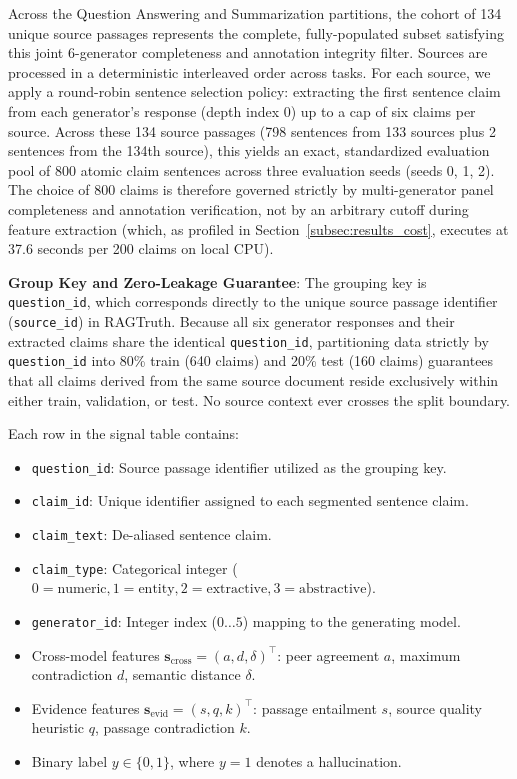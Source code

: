 \documentclass[pdflatex,sn-mathphys,Numbered]{sn-jnl}
\begin{document}
Across the Question Answering and Summarization partitions, the cohort of 134 unique source passages represents the complete, fully-populated subset satisfying this joint 6-generator completeness and annotation integrity filter. Sources are processed in a deterministic interleaved order across tasks. For each source, we apply a round-robin sentence selection policy: extracting the first sentence claim from each generator's response (depth index 0) up to a cap of six claims per source. Across these 134 source passages (798 sentences from 133 sources plus 2 sentences from the 134th source), this yields an exact, standardized evaluation pool of 800 atomic claim sentences across three evaluation seeds (seeds 0, 1, 2). The choice of 800 claims is therefore governed strictly by multi-generator panel completeness and annotation verification, not by an arbitrary cutoff during feature extraction (which, as profiled in Section~\ref{subsec:results_cost}, executes at 37.6 seconds per 200 claims on local CPU).

\noindent \textbf{Group Key and Zero-Leakage Guarantee}: The grouping key is \texttt{question\_id}, which corresponds directly to the unique source passage identifier (\texttt{source\_id}) in RAGTruth. Because all six generator responses and their extracted claims share the identical \texttt{question\_id}, partitioning data strictly by \texttt{question\_id} into 80\% train (640 claims) and 20\% test (160 claims) guarantees that all claims derived from the same source document reside exclusively within either train, validation, or test. No source context ever crosses the split boundary.

Each row in the signal table contains:
\begin{itemize}
    \item \texttt{question\_id}: Source passage identifier utilized as the grouping key.
    \item \texttt{claim\_id}: Unique identifier assigned to each segmented sentence claim.
    \item \texttt{claim\_text}: De-aliased sentence claim.
    \item \texttt{claim\_type}: Categorical integer ($0=\text{numeric}, 1=\text{entity}, 2=\text{extractive}, 3=\text{abstractive}$).
    \item \texttt{generator\_id}: Integer index ($0 \dots 5$) mapping to the generating model.
    \item Cross-model features $\mathbf{s}_{\mathrm{cross}} = (a, d, \delta)^{\top}$: peer agreement $a$, maximum contradiction $d$, semantic distance $\delta$.
    \item Evidence features $\mathbf{s}_{\mathrm{evid}} = (s, q, k)^{\top}$: passage entailment $s$, source quality heuristic $q$, passage contradiction $k$.
    \item Binary label $y \in \{0, 1\}$, where $y=1$ denotes a hallucination.
\end{itemize}
\end{document}
